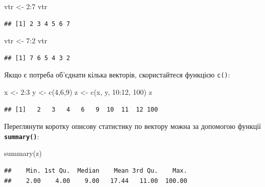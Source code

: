 \documentclass[
]{book}
\newenvironment{Shaded}{\begin{snugshade}}{\end{snugshade}}
\newcommand{\DecValTok}[1]{\textcolor[rgb]{0.00,0.00,0.81}{#1}}
\newcommand{\FunctionTok}[1]{\textcolor[rgb]{0.00,0.00,0.00}{#1}}
\newcommand{\NormalTok}[1]{#1}
\newcommand{\OtherTok}[1]{\textcolor[rgb]{0.56,0.35,0.01}{#1}}
\newcommand{\SpecialCharTok}[1]{\textcolor[rgb]{0.00,0.00,0.00}{#1}}
\begin{document}
\begin{Shaded}
\begin{Highlighting}[]
\NormalTok{vtr }\OtherTok{\textless{}{-}}  \DecValTok{2}\SpecialCharTok{:}\DecValTok{7}
\NormalTok{vtr}
\end{Highlighting}
\end{Shaded}

\begin{verbatim}
## [1] 2 3 4 5 6 7
\end{verbatim}

\begin{Shaded}
\begin{Highlighting}[]
\NormalTok{vtr }\OtherTok{\textless{}{-}} \DecValTok{7}\SpecialCharTok{:}\DecValTok{2}
\NormalTok{vtr}
\end{Highlighting}
\end{Shaded}

\begin{verbatim}
## [1] 7 6 5 4 3 2
\end{verbatim}

Якщо є потреба об'єднати кілька векторів, скористайтеся функцією \texttt{c()}:

\begin{Shaded}
\begin{Highlighting}[]
\NormalTok{x }\OtherTok{\textless{}{-}} \DecValTok{2}\SpecialCharTok{:}\DecValTok{3}
\NormalTok{y }\OtherTok{\textless{}{-}} \FunctionTok{c}\NormalTok{(}\DecValTok{4}\NormalTok{,}\DecValTok{6}\NormalTok{,}\DecValTok{9}\NormalTok{)}
\NormalTok{z }\OtherTok{\textless{}{-}} \FunctionTok{c}\NormalTok{(x, y, }\DecValTok{10}\SpecialCharTok{:}\DecValTok{12}\NormalTok{, }\DecValTok{100}\NormalTok{)}
\NormalTok{z}
\end{Highlighting}
\end{Shaded}

\begin{verbatim}
## [1]   2   3   4   6   9  10  11  12 100
\end{verbatim}

Переглянути коротку описову статистику по вектору можна за допомогою функції \textbf{\texttt{summary()}}:

\begin{Shaded}
\begin{Highlighting}[]
\FunctionTok{summary}\NormalTok{(z)}
\end{Highlighting}
\end{Shaded}

\begin{verbatim}
##    Min. 1st Qu.  Median    Mean 3rd Qu.    Max. 
##    2.00    4.00    9.00   17.44   11.00  100.00
\end{verbatim}
\end{document}
